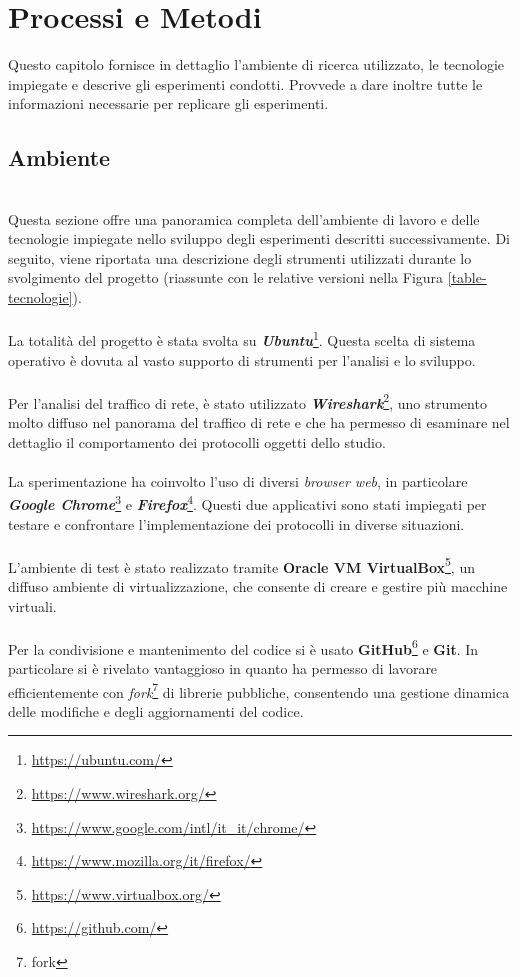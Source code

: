 \chapter{Processi e Metodi}
\label{cap:processi-metodologie}

Questo capitolo fornisce in dettaglio l'ambiente di ricerca utilizzato, le tecnologie impiegate e descrive gli esperimenti condotti. 
Provvede a dare inoltre tutte le informazioni necessarie per replicare gli esperimenti.

\section{Ambiente}
~\\
\indent Questa sezione offre una panoramica completa dell'ambiente di lavoro e delle tecnologie impiegate nello sviluppo degli esperimenti descritti successivamente. 
Di seguito, viene riportata una descrizione degli strumenti utilizzati durante lo svolgimento del progetto (riassunte con le relative versioni nella Figura \ref{table-tecnologie}).
\\\\
La totalità del progetto è stata svolta su \textbf{\emph{Ubuntu}}\footnote{\url{https://ubuntu.com/}}. 
Questa scelta di sistema operativo è dovuta al vasto supporto di strumenti per l'analisi e lo sviluppo.
\\\\
Per l'analisi del traffico di rete, è stato utilizzato \textbf{\emph{Wireshark}}\footnote{\url{https://www.wireshark.org/}}, 
uno strumento molto diffuso nel panorama del traffico di rete e che ha permesso di esaminare nel dettaglio il comportamento dei protocolli oggetti dello studio.
\\\\
La sperimentazione ha coinvolto l'uso di diversi \emph{browser web}, in particolare \textbf{\emph{Google Chrome}}\footnote{\url{https://www.google.com/intl/it_it/chrome/}} e \textbf{\emph{Firefox}}\footnote{\url{https://www.mozilla.org/it/firefox/}}. 
Questi due applicativi sono stati impiegati per testare e confrontare l'implementazione dei protocolli in diverse situazioni.
\\\\
L'ambiente di test è stato realizzato tramite \textbf{Oracle VM VirtualBox}\footnote{\url{https://www.virtualbox.org/}}, un diffuso ambiente di virtualizzazione, che consente di creare e gestire più macchine virtuali.
\\\\
Per la condivisione e mantenimento del codice si è usato \textbf{GitHub}\footnote{\url{https://github.com/}} e \textbf{Git}.
In particolare si è rivelato vantaggioso in quanto ha permesso di lavorare efficientemente con \emph{fork}\footnote{\gls{fork}} di librerie pubbliche, consentendo una gestione dinamica delle modifiche e degli aggiornamenti del codice.


